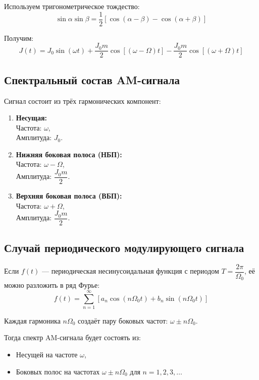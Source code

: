 \documentclass[a4paper]{article}
\begin{document}
Используем тригонометрическое тождество:
\[
\sin \alpha \sin \beta = \frac{1}{2} \left[ \cos(\alpha - \beta) - \cos(\alpha + \beta) \right]
\]

Получим:
\[
J(t) = J_0 \sin(\omega t) + \frac{J_0 m}{2} \cos\left[(\omega - \Omega)t\right] - \frac{J_0 m}{2} \cos\left[(\omega + \Omega)t\right]
\]

\subsection{Спектральный состав AM-сигнала}

Сигнал состоит из трёх гармонических компонент:

\begin{enumerate}
    \item \textbf{Несущая:} \\
        Частота: $\omega$, \\
        Амплитуда: $J_0$.
    
    \item \textbf{Нижняя боковая полоса (НБП):} \\
        Частота: $\omega - \Omega$, \\
        Амплитуда: $\dfrac{J_0 m}{2}$.
    
    \item \textbf{Верхняя боковая полоса (ВБП):} \\
        Частота: $\omega + \Omega$, \\
        Амплитуда: $\dfrac{J_0 m}{2}$.
\end{enumerate}

\subsection{Случай периодического модулирующего сигнала}

Если $f(t)$ — периодическая несинусоидальная функция с периодом $T = \dfrac{2\pi}{\Omega_0}$, её можно разложить в ряд Фурье:
\[
f(t) = \sum_{n=1}^{\infty} \left[ a_n \cos(n\Omega_0 t) + b_n \sin(n\Omega_0 t) \right]
\]

Каждая гармоника $n\Omega_0$ создаёт пару боковых частот: $\omega \pm n\Omega_0$.

Тогда спектр AM-сигнала будет состоять из:
\begin{itemize}
    \item Несущей на частоте $\omega$,
    \item Боковых полос на частотах $\omega \pm n\Omega_0$ для $n = 1, 2, 3, \dots$
\end{itemize}
\end{document}
